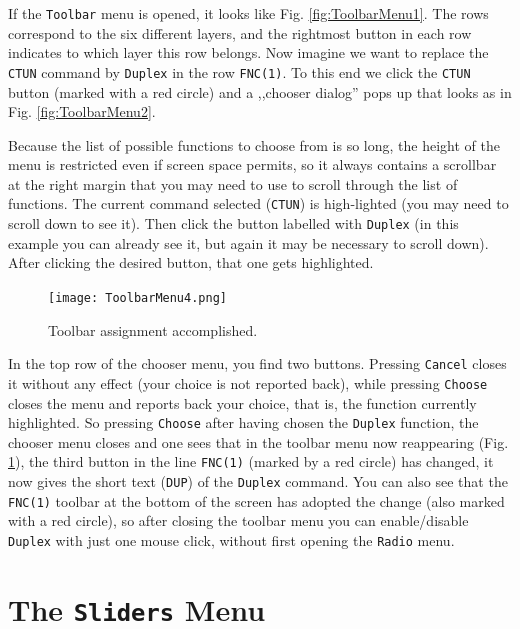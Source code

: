 \documentclass[12pt]{book}
\def\rett#1{\texttt{\color{red}#1}}
\def\bltt#1{\texttt{\color{blue}#1}}
\begin{document}
If the \bltt{Toolbar} menu is opened, it looks like Fig. \ref{fig:ToolbarMenu1}.
The rows correspond to the six different layers, and the rightmost button in each
row indicates to which layer this row belongs. Now imagine we want to replace
the \bltt{CTUN} command by \bltt{Duplex} in the row \rett{FNC(1)}. To this end
we click the \bltt{CTUN} button (marked with a red circle) and
a  ,,chooser dialog'' pops up that looks as
in Fig. \ref{fig:ToolbarMenu2}.


Because the list of possible functions to choose from is so long, the height of the menu
is restricted even if screen space permits, so it always contains a scrollbar at the right
margin that you may need to use to scroll through the list of functions.
The current command selected (\texttt{CTUN}) is high-lighted (you may need to scroll down
to see it). Then click the button labelled with \bltt{Duplex} (in this example you can
already see it, but again it may be necessary to scroll down). After clicking the desired
button, that one gets highlighted.


\begin{figure}[ht!]
\center
\texttt{[image: ToolbarMenu4.png]}
\caption{Toolbar assignment accomplished.}
\label{fig:ToolbarMenu4}
\end{figure}

In the top row of the chooser menu, you find two buttons. Pressing \rett{Cancel} closes it
without any effect (your choice is not reported back), while pressing \rett{Choose} closes
the menu and reports back your choice, that is, the function currently highlighted.
So pressing \rett{Choose} after having chosen the \bltt{Duplex} function, the chooser
menu closes
and one sees that in the toolbar menu now reappearing (Fig. \ref{fig:ToolbarMenu4}), the third button
in the line \rett{FNC(1)} (marked by a red circle) has changed,
it now gives the short text (\texttt{DUP}) of the \bltt{Duplex} command. You can also see
that the \rett{FNC(1)} toolbar at the bottom of the screen has adopted the change
(also marked with a red circle), so
after closing the toolbar menu you can enable/disable \bltt{Duplex} with just one mouse click,
without first opening the \bltt{Radio} menu.



\section{The \texttt{Sliders} Menu}
\label{sec:SlidersMenu}
\end{document}
